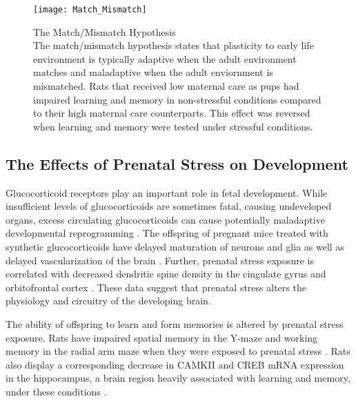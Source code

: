 \documentclass[12pt,twoside]{reedthesis}
\begin{document}
 \begin{figure}[htbp] 
\begin{centering} 
\texttt{[image: Match\_Mismatch]}
\caption[The Match/Mismatch Hypothesis]{\footnotesize{The Match/Mismatch
    Hypothesis \\ The match/mismatch hypothesis states that plasticity to early
    life environment is typically adaptive when the adult environment matches
    and maladaptive when the adult enviornment is mismatched. Rats
    that received low maternal care as pups had impaired learning and memory in
    non-stressful conditions compared to their high maternal care counterparts.
    This effect was reversed when learning and memory were tested under
    stressful conditions.}}
\label{match}
\end{centering} 
\end{figure}

\subsection{The Effects of Prenatal Stress on Development}
Glucocorticoid receptors play an important role in fetal development. While
insufficient levels of glucocorticoids are sometimes fatal, causing undeveloped organs,
excess circulating glucocorticoids can cause potentially maladaptive developmental
reprogramming \citep{2017Nrid}. The offspring of pregnant mice treated with synthetic glucocorticoids
 have delayed maturation of neurons and glia as well as delayed vascularization
 of the brain \citep{gravanis_hormones_2011}. Further, prenatal stress exposure is correlated with
 decreased dendritic spine density in the cingulate gyrus and orbitofrontal
 cortex \citep{murmu_changes_2006}. These data suggest that prenatal stress alters the
 physiology and circuitry of the developing brain.

 The ability of offspring to learn and form memories is altered by prenatal
 stress exposure. Rats have impaired spatial memory in the Y-maze and
 working memory in the radial arm maze when they were exposed to prenatal stress
 \citep{vallee_long-term_1999}. Rats also display a corresponding
 decrease in CAMKII and CREB mRNA expression in the hippocampus, a brain region
 heavily associated with learning and memory, under these
 conditions \citep{sun_prenatal_2017}. 
\end{document}
